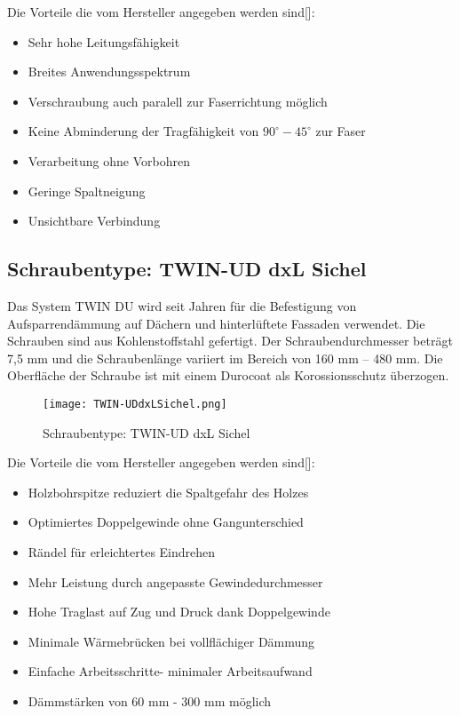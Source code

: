 \documentclass[12 pt,a4 paper ]{scrreprt}
\begin{document}
Die Vorteile die vom Hersteller angegeben werden sind[]:

\begin{itemize}
	\item Sehr hohe Leitungsfähigkeit
	\item Breites Anwendungsspektrum
	\item Verschraubung auch paralell zur Faserrichtung möglich
	\item Keine Abminderung der Tragfähigkeit von $90^\circ  -  45^\circ$ zur Faser
	\item Verarbeitung ohne Vorbohren
	\item Geringe Spaltneigung
	\item Unsichtbare Verbindung
\end{itemize}


\subsection{Schraubentype: TWIN-UD dxL Sichel }
Das System TWIN DU wird seit Jahren für die Befestigung von Aufsparrendämmung auf Dächern  und hinterlüftete Fassaden verwendet. Die Schrauben sind aus Kohlenstoffstahl gefertigt. Der Schraubendurchmesser beträgt 7,5 mm  und die Schraubenlänge variiert im Bereich von 160 mm – 480 mm. Die Oberfläche der Schraube ist mit einem Durocoat als Korossionsschutz überzogen.

\begin{figure}[h]
\begin{center}
\texttt{[image: TWIN-UDdxLSichel.png]}
\caption{Schraubentype: TWIN-UD dxL Sichel}
\end{center}
\end{figure}


Die Vorteile die vom Hersteller angegeben werden sind[]:

\begin{itemize}
	\item Holzbohrspitze reduziert die Spaltgefahr des 	Holzes
	\item Optimiertes Doppelgewinde ohne		 Gangunterschied
	\item Rändel für erleichtertes Eindrehen
	\item Mehr Leistung durch angepasste 	Gewindedurchmesser
	\item Hohe Traglast auf Zug und Druck dank 	Doppelgewinde
	\item Minimale Wärmebrücken bei vollflächiger 	Dämmung
	\item Einfache Arbeitsschritte- minimaler 	Arbeitsaufwand
	\item Dämmstärken von 60 mm - 300 mm möglich
\end{itemize}
\end{document}
